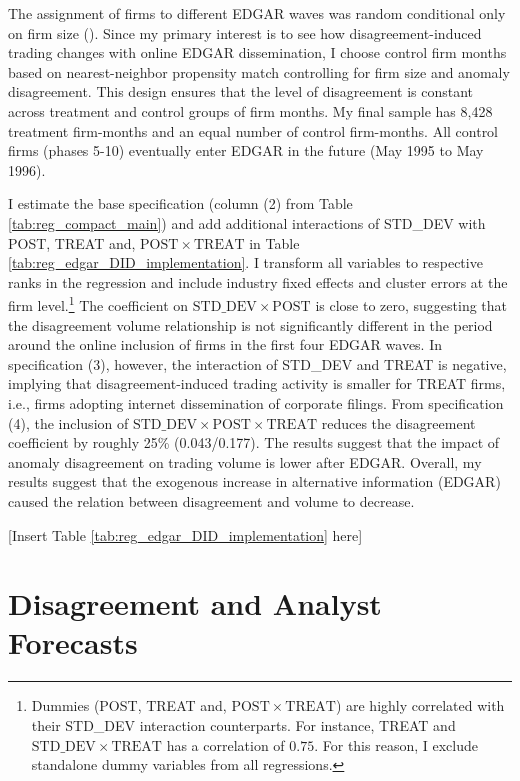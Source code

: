 \documentclass[
  12pt,
  a4paper,
  twoside,
  onecolumn]{article}
\begin{document}
The assignment of firms to different EDGAR waves was random conditional
only on firm size (\cite{chang_2020}). Since my primary interest is to
see how disagreement-induced trading changes with online EDGAR
dissemination, I choose control firm months based on nearest-neighbor
propensity match controlling for firm size and anomaly disagreement.
This design ensures that the level of disagreement is constant across
treatment and control groups of firm months. My final sample has 8,428
treatment firm-months and an equal number of control firm-months. All
control firms (phases 5-10) eventually enter EDGAR in the future (May
1995 to May 1996).

I estimate the base specification (column (2) from Table
\ref{tab:reg_compact_main}) and add additional interactions of STD\_DEV
with POST, TREAT and, \(\mathrm{POST \times TREAT}\) in Table
\ref{tab:reg_edgar_DID_implementation}. I transform all variables to
respective ranks in the regression and include industry fixed effects
and cluster errors at the firm level.\footnote{Dummies (POST, TREAT and,
  \(\mathrm{POST \times TREAT}\)) are highly correlated with their
  STD\_DEV interaction counterparts. For instance, TREAT and
  \(\mathrm{STD\_DEV \times TREAT}\) has a correlation of \(0.75\). For
  this reason, I exclude standalone dummy variables from all
  regressions.} The coefficient on \(\mathrm{STD\_DEV \times POST}\) is
close to zero, suggesting that the disagreement volume relationship is
not significantly different in the period around the online inclusion of
firms in the first four EDGAR waves. In specification (3), however, the
interaction of STD\_DEV and TREAT is negative, implying that
disagreement-induced trading activity is smaller for TREAT firms, i.e.,
firms adopting internet dissemination of corporate filings. From
specification (4), the inclusion of
\(\mathrm{STD\_DEV \times POST \times TREAT}\) reduces the disagreement
coefficient by roughly 25\% (0.043/0.177). The results suggest that the
impact of anomaly disagreement on trading volume is lower after EDGAR.
Overall, my results suggest that the exogenous increase in alternative
information (EDGAR) caused the relation between disagreement and volume
to decrease.

\begin{center} { [Insert Table \ref{tab:reg_edgar_DID_implementation} here] } \end{center}

\hypertarget{sec:disagreement_and_dispersion}{%
\section{Disagreement and Analyst
Forecasts}\label{sec:disagreement_and_dispersion}}
\end{document}
